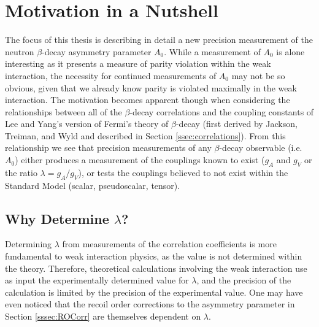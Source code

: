 \section{Motivation in a Nutshell}

The focus of this thesis is describing in detail a new precision
measurement of the neutron $\beta$-decay asymmetry parameter $A_0$.
While a measurement of $A_0$ is alone interesting as it presents
a measure of parity
violation within the weak interaction, the necessity for continued measurements of $A_0$
may not be so obvious, given that we already know parity is violated maximally in the
weak interaction. The motivation
becomes apparent though when considering the relationships between all of the
$\beta$-decay correlations and the coupling constants of Lee and Yang's version of Fermi's
theory of $\beta$-decay
(first derived by Jackson, Treiman, and Wyld \cite{jackson1957a} and
described in Section \ref{ssec:correlations}). From this relationship we see that precision
measurements of any $\beta$-decay observable (i.e. $A_0$) either produces a measurement of the couplings
known to exist ($g_A$ and $g_V$ or the ratio $\lambda=g_A/g_V$), or tests the couplings believed to not exist within the
Standard Model (scalar, pseudoscalar, tensor).

\subsection{Why Determine $\lambda$?}

Determining $\lambda$ from measurements of the correlation coefficients is more fundamental to
weak interaction physics, as the value is not determined within the theory. Therefore,
theoretical calculations involving the weak interaction use as input the experimentally
determined value for $\lambda$, and the precision of the calculation is limited by the
precision of the experimental value. One may have even noticed that the recoil order corrections to
the asymmetry parameter in
Section \ref{sssec:ROCorr} are themselves dependent on $\lambda$.

